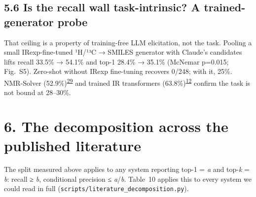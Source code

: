 \documentclass[
  10pt,
]{article}
\begin{document}
\hypertarget{is-the-recall-wall-task-intrinsic-a-trained-generator-probe}{%
\subsection{5.6 Is the recall wall task-intrinsic? A trained-generator
probe}\label{is-the-recall-wall-task-intrinsic-a-trained-generator-probe}}

That ceiling is a property of training-free LLM elicitation, not the
task. Pooling a small IRexp-fine-tuned ¹H/¹³C → SMILES generator with
Claude's candidates lifts recall 33.5\% → 54.1\% and top-1 28.4\% →
35.1\% (McNemar p=0.015; Fig.~S5). Zero-shot without IRexp fine-tuning
recovers 0/248; with it, 25\%. NMR-Solver
(52.9\%)\textsuperscript{\protect\hyperlink{ref-jin2025nmrsolver}{29}}
and trained IR transformers
(63.8\%)\textsuperscript{\protect\hyperlink{ref-alberts2025benchmarks}{12}}
confirm the task is not bound at 28--30\%.


\hypertarget{the-decomposition-across-the-published-literature}{%
\section{6. The decomposition across the published
literature}\label{the-decomposition-across-the-published-literature}}

The split measured above applies to any system reporting top-1 =
\emph{a} and top-\emph{k} = \emph{b}: recall ≥ \emph{b}, conditional
precision ≤ \emph{a}/\emph{b}. Table~10 applies this to every system we
could read in full
(\texttt{scripts/\hspace{0pt}literature\_decomposition.py}).
\end{document}
